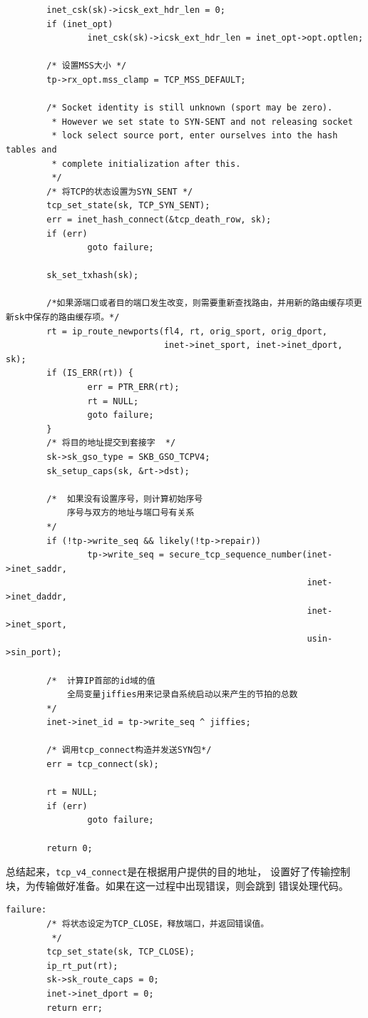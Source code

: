 \begin{verbatim}
        inet_csk(sk)->icsk_ext_hdr_len = 0;
        if (inet_opt)
                inet_csk(sk)->icsk_ext_hdr_len = inet_opt->opt.optlen;

        /* 设置MSS大小 */
        tp->rx_opt.mss_clamp = TCP_MSS_DEFAULT;

        /* Socket identity is still unknown (sport may be zero).
         * However we set state to SYN-SENT and not releasing socket
         * lock select source port, enter ourselves into the hash tables and
         * complete initialization after this.
         */
        /* 将TCP的状态设置为SYN_SENT */
        tcp_set_state(sk, TCP_SYN_SENT);
        err = inet_hash_connect(&tcp_death_row, sk);
        if (err)
                goto failure;

        sk_set_txhash(sk);

        /*如果源端口或者目的端口发生改变，则需要重新查找路由，并用新的路由缓存项更新sk中保存的路由缓存项。*/
        rt = ip_route_newports(fl4, rt, orig_sport, orig_dport,
                               inet->inet_sport, inet->inet_dport, sk);
        if (IS_ERR(rt)) {
                err = PTR_ERR(rt);
                rt = NULL;
                goto failure;
        }
        /* 将目的地址提交到套接字  */
        sk->sk_gso_type = SKB_GSO_TCPV4;
        sk_setup_caps(sk, &rt->dst);

        /*  如果没有设置序号，则计算初始序号 
            序号与双方的地址与端口号有关系
        */
        if (!tp->write_seq && likely(!tp->repair))
                tp->write_seq = secure_tcp_sequence_number(inet->inet_saddr,
                                                           inet->inet_daddr,
                                                           inet->inet_sport,
                                                           usin->sin_port);
                                                           
        /*  计算IP首部的id域的值 
            全局变量jiffies用来记录自系统启动以来产生的节拍的总数       
        */
        inet->inet_id = tp->write_seq ^ jiffies;

        /* 调用tcp_connect构造并发送SYN包*/
        err = tcp_connect(sk);

        rt = NULL;
        if (err)
                goto failure;

        return 0;
\end{verbatim}

            总结起来，\texttt{tcp_v4_connect}是在根据用户提供的目的地址，
            设置好了传输控制块，为传输做好准备。如果在这一过程中出现错误，则会跳到
            错误处理代码。
\begin{verbatim}
failure:
        /* 将状态设定为TCP_CLOSE，释放端口，并返回错误值。
         */
        tcp_set_state(sk, TCP_CLOSE);
        ip_rt_put(rt);
        sk->sk_route_caps = 0;
        inet->inet_dport = 0;
        return err;
\end{verbatim}

